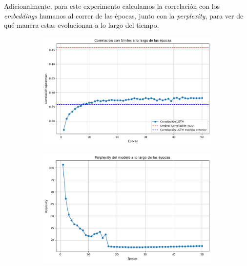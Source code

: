 Adicionalmente, para este experimento calculamos la correlación con los \textit{embeddings} humanos 
al correr de las épocas, junto con la \textit{perplexity}, para ver de qué manera estas evolucionan 
a lo largo del tiempo.


\begin{figure}[htb]
    \centering
    \begin{subfigure}[b]{.45\textwidth}
        \centering
        \includegraphics[width=\textwidth]{imagenes/simlex_corr_10per.png}
        \caption{}
        \label{fig:simlex_corr_10per.png}
    \end{subfigure}
    \hfill
    \begin{subfigure}[b]{.45\textwidth}
        \centering
        \includegraphics[width=\textwidth]{imagenes/perp_10per.png}

\end{subfigure}
\end{figure}
